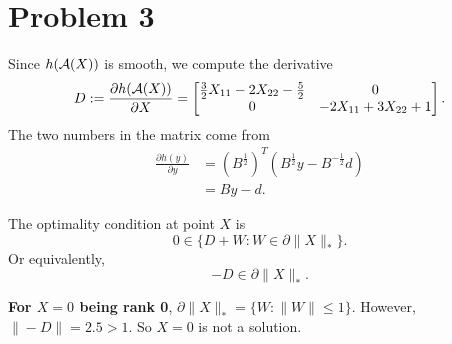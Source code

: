 \section{Problem 3}

Since $h(\mathcal{A}(X))$ is smooth,
we compute the derivative
\begin{equation}
    D:=\frac{\partial h(\mathcal{A}(X))}{\partial X} =
    \begin{bmatrix}
        \frac{3}{2}X_{11}-2X_{22}-\frac{5}{2} & 0 \\
        0   & -2X_{11}+3X_{22}+1 \\
    \end{bmatrix}.
\end{equation}
The two numbers in the matrix come from
\begin{equation}
\begin{split}
    \frac{\partial h(y)}{\partial y}
        &= (B^{\frac{1}{2}})^T(B^{\frac{1}{2}}y-B^{-\frac{1}{2}}d) \\
        &= By-d.
\end{split}
\end{equation}

The optimality condition at point $X$ is
\begin{equation}
    0\in\{D+W:W\in\partial\|X\|_*\}.
\end{equation}
Or equivalently,
\begin{equation}\label{eq:cond}
    -D\in\partial\|X\|_*.
\end{equation}

\textbf{For $X=0$ being rank 0},
$\partial\|X\|_*=\{W:\|W\|\le1\}$.
However,
$\|-D\|=2.5>1$.
So $X=0$ is not a solution.

